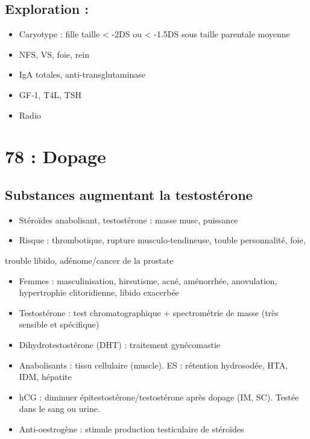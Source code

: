\documentclass[11pt]{article}
\begin{document}
\subsection{Exploration :}
\label{sec:orgb36cceb}
\begin{itemize}
\item Caryotype : fille taille < -2DS ou < -1.5DS sous taille parentale moyenne
\item NFS, VS, foie, rein
\item IgA totales, anti-transglutaminase
\item GF-1, T4L, TSH
\item Radio
\end{itemize}

\section{78 : Dopage}
\label{sec:org4d65428}
\subsection{Substances augmentant la testostérone}
\label{sec:orga3db99a}
\begin{itemize}
\item Stéroïdes anabolisant, testostérone : \inc masse musc, puissance
\item Risque : thrombotique, rupture musculo-tendineuse, touble personnalité, foie,
\end{itemize}
trouble libido, adénome/cancer de la prostate
\begin{itemize}
\item Femmes : masculinisation, hirsutisme, acné, aménorrhée, anovulation,
hypertrophie clitoridienne, libido exacerbée
\end{itemize}

\vspace*{0.5cm}
\begin{itemize}
\item Testostérone : test chromatographique + spectrométrie de masse (très sensible
et spécifique)
\item Dihydrotestostérone (DHT) : traitement gynécomastie
\item Anabolisants : \inc tissu cellulaire (muscle). ES : rétention hydrosodée, HTA,
IDM, hépatite
\item hCG : diminuer épitestostérone/testostérone après dopage (IM, SC). Testée dans
le sang ou urine.
\item Anti-oestrogène : stimule production testiculaire de stéroïdes
\end{itemize}
\end{document}
